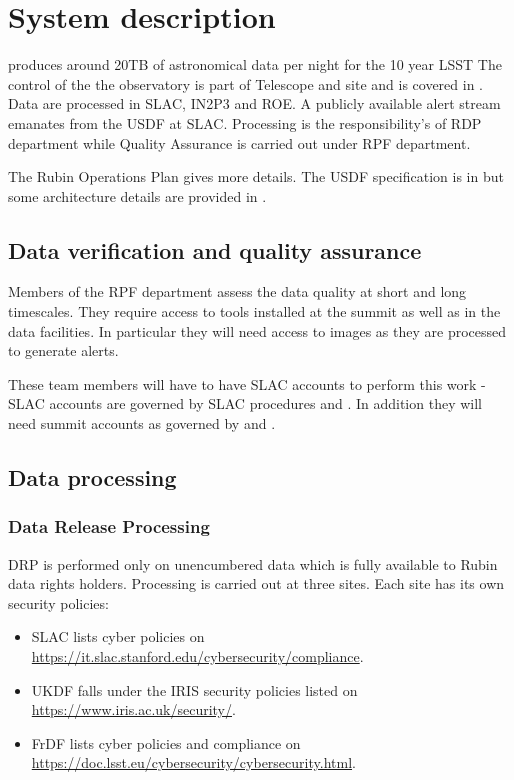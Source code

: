 \section{System description} \label{sec:desc}

\VRO produces around 20TB of astronomical data per night for the 10 year \gls{LSST}
The control of the the observatory is part of Telescope and site and is covered in .
Data are processed in \gls{SLAC}, \gls{IN2P3} and \gls{ROE}.
A publicly available alert stream emanates from the \gls{USDF} at \gls{SLAC}.
Processing is the responsibility's of \gls{RDP} department while \gls{Quality Assurance} is carried out under \gls{RPF} department.

The Rubin \gls{Operations} Plan  gives more details.
The \gls{USDF} specification is in  but some architecture details are provided in .






\subsection{Data verification and quality assurance }
Members of the \gls{RPF} department assess the data quality at short and long timescales.
They require access to tools installed at the summit as well as in the data facilities.
In particular they will need access to images as they are processed to generate alerts.

These team members will have to have \gls{SLAC} accounts to perform this work - \gls{SLAC} accounts are governed by SLAC procedures \cite{SLACOB} and \cite{SLACNH}.
In addition they will need summit accounts as governed by  and .



\subsection{Data processing}
\subsubsection{Data Release Processing}
DRP is performed only on unencumbered data which is fully available to Rubin data rights holders.
Processing is carried out at three sites.
Each site has its own security policies:

\begin{itemize}
\item SLAC lists cyber policies on \url{https://it.slac.stanford.edu/cybersecurity/compliance}.
\item UKDF falls under the \gls{IRIS} security policies listed on \url{https://www.iris.ac.uk/security/}.
\item FrDF lists cyber policies and compliance on \url{https://doc.lsst.eu/cybersecurity/cybersecurity.html}.
\end{itemize}



